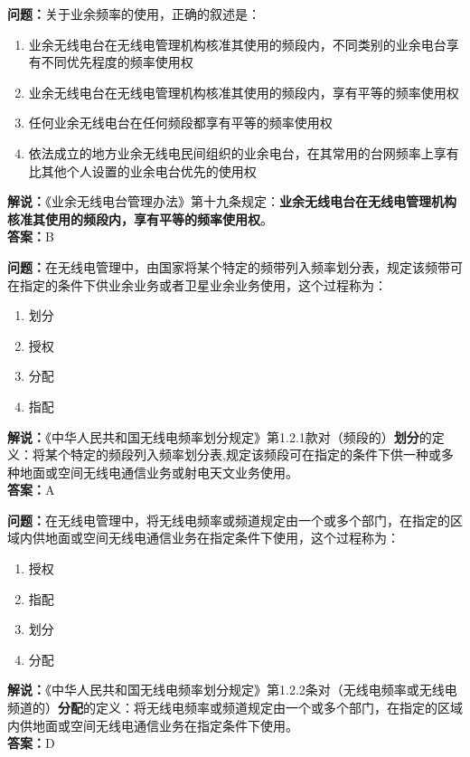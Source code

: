 \bigskip


\noindent\textbf{问题：}关于业余频率的使用，正确的叙述是：
\begin{enumerate}[label=\Alph*), leftmargin=3em]
	\item 业余无线电台在无线电管理机构核准其使用的频段内，不同类别的业余电台享有不同优先程度的频率使用权
	\item 业余无线电台在无线电管理机构核准其使用的频段内，享有平等的频率使用权
	\item 任何业余无线电台在任何频段都享有平等的频率使用权
	\item 依法成立的地方业余无线电民间组织的业余电台，在其常用的台网频率上享有比其他个人设置的业余电台优先的使用权
\end{enumerate}
\noindent\textbf{解说：}《业余无线电台管理办法》第十九条规定：\textbf{业余无线电台在无线电管理机构核准其使用的频段内，享有平等的频率使用权}。\\\noindent\textbf{答案：}B



\bigskip


\noindent\textbf{问题：}在无线电管理中，由国家将某个特定的频带列入频率划分表，规定该频带可在指定的条件下供业余业务或者卫星业余业务使用，这个过程称为：
\begin{enumerate}[label=\Alph*), leftmargin=3em]
	\item 划分
	\item 授权
	\item 分配
	\item 指配
\end{enumerate}
\noindent\textbf{解说：}《中华人民共和国无线电频率划分规定》第1.2.1款对（频段的）\textbf{划分}的定义：将某个特定的频段列入频率划分表,规定该频段可在指定的条件下供一种或多种地面或空间无线电通信业务或射电天文业务使用。\\
\textbf{答案：}A



\bigskip


\noindent\textbf{问题：}在无线电管理中，将无线电频率或频道规定由一个或多个部门，在指定的区域内供地面或空间无线电通信业务在指定条件下使用，这个过程称为：
\begin{enumerate}[label=\Alph*), leftmargin=3em]
	\item 授权
	\item 指配
	\item 划分
	\item 分配
\end{enumerate}
\noindent\textbf{解说：}《中华人民共和国无线电频率划分规定》第1.2.2条对（无线电频率或无线电频道的）\textbf{分配}的定义：将无线电频率或频道规定由一个或多个部门，在指定的区域内供地面或空间无线电通信业务在指定条件下使用。\\
\textbf{答案：}D



